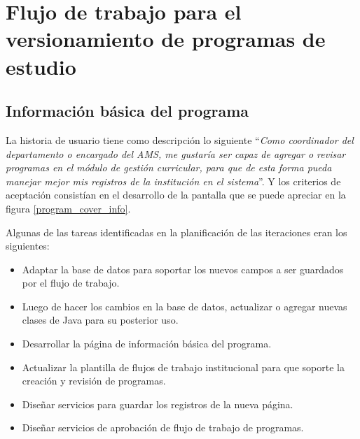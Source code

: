 \section{Flujo de trabajo para el versionamiento de programas de estudio}
\begin{table}[H]
\centering
{}
\caption{Historias de usuario para flujo de trabajo para el versionamiento de programas de estudio}
\label{epic:8}
\end{table}

\subsection{Información básica del programa}
La historia de usuario tiene como descripción lo siguiente \enquote{\textit{Como coordinador del departamento o encargado del AMS, me gustaría ser capaz de agregar o revisar programas en el módulo de gestión curricular, para que de esta forma pueda manejar mejor mis registros de la institución en el sistema}}. Y los criterios de aceptación consistían en el desarrollo de la pantalla que se puede apreciar en la figura \ref{program_cover_info}.

Algunas de las tareas identificadas en la planificación de las iteraciones eran los siguientes:
\begin{itemize}
	\item Adaptar la base de datos para soportar los nuevos campos a ser guardados por el flujo de trabajo.
	\item Luego de hacer los cambios en la base de datos, actualizar o agregar nuevas clases de Java para su posterior uso.
	\item Desarrollar la página de información básica del programa.
	\item Actualizar la plantilla de flujos de trabajo institucional para que soporte la creación y revisión de programas.
	\item Diseñar servicios para guardar los registros de la nueva página.
	\item Diseñar servicios de aprobación de flujo de trabajo de programas.
\end{itemize}

